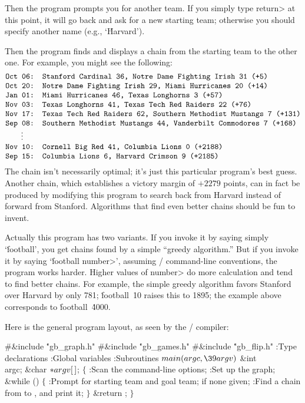 Then the program prompts you for another team. If you simply type
\<return> at this point, it will go back and ask for a new starting team;
otherwise you should specify another name (e.g., `\.{Harvard}').

Then the program finds and displays a chain from the starting team
to the other one. For example, you might see the following:
$$\vbox{\halign{\tt#\hfil\cr
Oct 06: Stanford Cardinal 36, Notre Dame Fighting Irish 31 (+5)\cr
Oct 20: Notre Dame Fighting Irish 29, Miami Hurricanes 20 (+14)\cr
Jan 01: Miami Hurricanes 46, Texas Longhorns 3 (+57)\cr
Nov 03: Texas Longhorns 41, Texas Tech Red Raiders 22 (+76)\cr
Nov 17: Texas Tech Red Raiders 62, Southern Methodist Mustangs 7 (+131)\cr
Sep 08: Southern Methodist Mustangs 44, Vanderbilt Commodores 7 (+168)\cr
\omit\qquad\vdots\cr
Nov 10: Cornell Big Red 41, Columbia Lions 0 (+2188)\cr
Sep 15: Columbia Lions 6, Harvard Crimson 9 (+2185)\cr}}$$
The chain isn't necessarily optimal; it's just this particular
program's best guess. Another chain, which establishes a victory margin
of $+2279$ points, can in fact be produced by modifying this
program to search back from Harvard instead of forward from Stanford.
Algorithms that find even better chains should be fun to invent.

Actually this program has two variants. If you invoke it by saying simply
`\.{football}', you get chains found by a simple ``greedy algorithm.''
But if you invoke it by saying `\.{football} \<number>', assuming \UNIX/
command-line conventions, the program works harder. Higher values of
\<number> do more calculation and tend to find better chains. For
example, the simple greedy algorithm favors Stanford over Harvard by
only 781; \.{football}~\.{10} raises this to 1895; the
example above corresponds to \.{football}~\.{4000}.

\fi

Here is the general program layout, as seen by the \CEE/ compiler:

\Y\B\8\#\&{include} \.{"gb\_graph.h"}\6
\8\#\&{include} \.{"gb\_games.h"}\6
\8\#\&{include} \.{"gb\_flip.h"}\6
\ATH\7
:Type declarations\X\6
:Global variables\X\6
:Subroutines\X\7
\1\1${}\\{main}(\\{argc},\39\\{argv}){}$\6
\&{int} \\{argc};\6
\&{char} ${}{*}\\{argv}[\,]{}$;\2\2\6
${}\{{}$\1\6
:Scan the command-line options\X;\6
:Set up the graph\X;\6
\&{while} ()\5
${}\{{}$\1\6
:Prompt for starting team and goal team;  if none given\X;\6
:Find a chain from  to , and print it\X;\6
\4${}\}{}$\2\6
\&{return} ;\6
\4${}\}{}$\2\par
\fi

